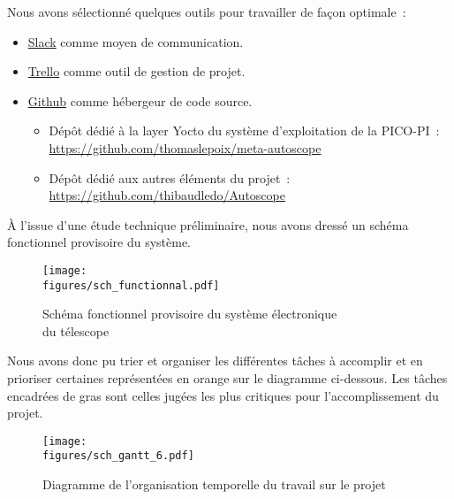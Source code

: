 Nous avons sélectionné quelques outils pour travailler de façon optimale~:
\begin{itemize}[label=$\bullet$]
	\item {\href{https://slack.com}{Slack}} comme moyen de communication.
	\item {\href{https://trello.com}{Trello}} comme outil de gestion de projet.
	\item {\href{https://github.com}{Github}} comme hébergeur de code source.
	\begin{itemize}
		\item Dépôt dédié à la layer Yocto du système d'exploitation de la PICO-PI~:\\\url{https://github.com/thomaslepoix/meta-autoscope}
		\item Dépôt dédié aux autres éléments du projet~:\\\url{https://github.com/thibaudledo/Autoscope}
		\end{itemize}
	\end{itemize}

\vspace{1cm}

À l'issue d'une étude technique préliminaire, nous avons dressé un schéma fonctionnel provisoire du système.

\begin{figure}[H]
	\centering
    \texttt{[image: \\figures/sch\_functionnal.pdf]}
    \decoRule
    \caption[
    Schéma fonctionnel provisoire du système électronique du télescope]{
    Schéma fonctionnel provisoire du système électronique\\du télescope}
    \label{fig:Schéma fonctionnel provisoire du système électronique du télescope}
	\end{figure}

\vspace{1cm}

Nous avons donc pu trier et organiser les différentes tâches à accomplir et en prioriser certaines représentées en orange sur le diagramme ci-dessous. Les tâches encadrées de gras sont celles jugées les plus critiques pour l'accomplissement du projet.

\begin{figure}[H]
	\centering
    \texttt{[image: \\figures/sch\_gantt\_6.pdf]}
    \decoRule
    \caption[
    Diagramme de l'organisation temporelle du travail sur le projet]{
    Diagramme de l'organisation temporelle du travail sur le projet}
    \label{fig:Diagramme de l'organisation temporelle du travail sur le projet}
	\end{figure}

